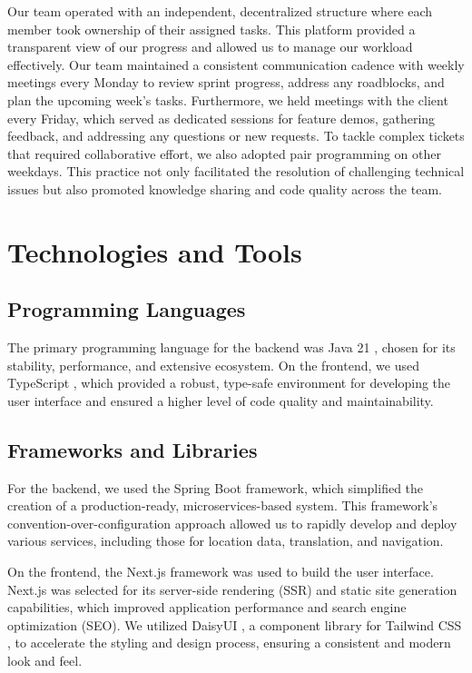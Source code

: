 Our team operated with an independent, decentralized structure where each member took ownership of their assigned tasks. This platform provided a transparent view of our progress and allowed us to manage our workload effectively. Our team maintained a consistent communication cadence with weekly meetings every Monday to review sprint progress, address any roadblocks, and plan the upcoming week's tasks. Furthermore, we held meetings with the client every Friday, which served as dedicated sessions for feature demos, gathering feedback, and addressing any questions or new requests. To tackle complex tickets that required collaborative effort, we also adopted pair programming on other weekdays. This practice not only facilitated the resolution of challenging technical issues but also promoted knowledge sharing and code quality across the team.

    
\section{Technologies and Tools}
    \subsection{Programming Languages}
        The primary programming language for the backend was Java 21 \cite{oracle_java21}, chosen for its stability, performance, and extensive ecosystem. On the frontend, we used TypeScript \cite{typescript}, which provided a robust, type-safe environment for developing the user interface and ensured a higher level of code quality and maintainability.
    \subsection{Frameworks and Libraries}
        For the backend, we used the Spring Boot \cite{spring_boot} framework, which simplified the creation of a production-ready, microservices-based \cite{microservices_io} system. This framework's convention-over-configuration approach allowed us to rapidly develop and deploy various services, including those for location data, translation, and navigation.

        On the frontend, the Next.js \cite{nextjs} framework was used to build the user interface. Next.js was selected for its server-side rendering (SSR) \cite{epam_ssr} and static site generation capabilities, which improved application performance and search engine optimization (SEO). We utilized DaisyUI \cite{daisyui}, a component library for Tailwind CSS \cite{tailwindcss}, to accelerate the styling and design process, ensuring a consistent and modern look and feel.
